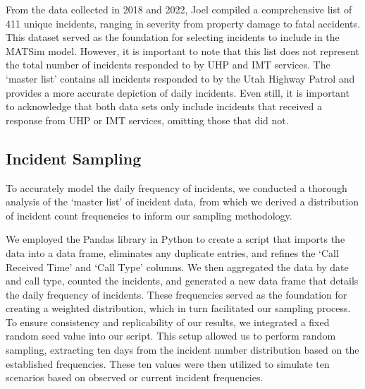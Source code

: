 \documentclass[fancy, oneside, mastersfancy, ms]{byuthesis}
\begin{document}
From the data collected in 2018 and 2022, Joel compiled a comprehensive
list of 411 unique incidents, ranging in severity from property damage
to fatal accidents. This dataset served as the foundation for selecting
incidents to include in the MATSim model. However, it is important to
note that this list does not represent the total number of incidents
responded to by UHP and IMT services. The `master list' contains all
incidents responded to by the Utah Highway Patrol and provides a more
accurate depiction of daily incidents. Even still, it is important to
acknowledge that both data sets only include incidents that received a
response from UHP or IMT services, omitting those that did not.

\hypertarget{incident-sampling}{%
\subsection{Incident Sampling}\label{incident-sampling}}

To accurately model the daily frequency of incidents, we conducted a
thorough analysis of the `master list' of incident data, from which we
derived a distribution of incident count frequencies to inform our
sampling methodology.

We employed the Pandas library in Python to create a script that imports
the data into a data frame, eliminates any duplicate entries, and
refines the `Call Received Time' and `Call Type' columns. We then
aggregated the data by date and call type, counted the incidents, and
generated a new data frame that details the daily frequency of
incidents. These frequencies served as the foundation for creating a
weighted distribution, which in turn facilitated our sampling process.
To ensure consistency and replicability of our results, we integrated a
fixed random seed value into our script. This setup allowed us to
perform random sampling, extracting ten days from the incident number
distribution based on the established frequencies. These ten values were
then utilized to simulate ten scenarios based on observed or current
incident frequencies.
\end{document}
